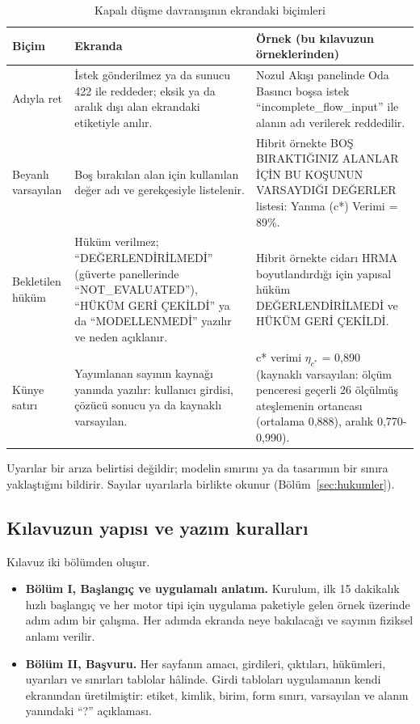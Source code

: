 \documentclass[11pt,a4paper]{article}
\newcommand{\ui}[1]{\textsf{#1}}
\begin{document}
\begin{table}[htbp]
\centering\small
\caption{Kapalı düşme davranışının ekrandaki biçimleri}\label{tab:kapali}
\begin{tabular}{@{}>{\raggedright\arraybackslash}p{3.6cm}>{\raggedright\arraybackslash}p{6.4cm}>{\raggedright\arraybackslash}p{5.6cm}@{}}
\toprule
\textbf{Biçim} & \textbf{Ekranda} & \textbf{Örnek (bu kılavuzun örneklerinden)} \\
\midrule
Adıyla ret & İstek gönderilmez ya da sunucu 422 ile reddeder; eksik ya da aralık dışı alan ekrandaki etiketiyle anılır. & Nozul Akışı panelinde \ui{Oda Basıncı} boşsa istek ``incomplete\_flow\_input'' ile alanın adı verilerek reddedilir. \\
Beyanlı varsayılan & Boş bırakılan alan için kullanılan değer adı ve gerekçesiyle listelenir. & Hibrit örnekte \ui{BOŞ BIRAKTIĞINIZ ALANLAR İÇİN BU KOŞUNUN VARSAYDIĞI DEĞERLER} listesi: \ui{Yanma (c*) Verimi = 89\%}. \\
Bekletilen hüküm & Hüküm verilmez; ``DEĞERLENDİRİLMEDİ'' (güverte panellerinde ``NOT\_EVALUATED''), ``HÜKÜM GERİ ÇEKİLDİ'' ya da ``MODELLENMEDİ'' yazılır ve neden açıklanır. & Hibrit örnekte cidarı HRMA boyutlandırdığı için yapısal hüküm \ui{DEĞERLENDİRİLMEDİ} ve \ui{HÜKÜM GERİ ÇEKİLDİ}. \\
Künye satırı & Yayımlanan sayının kaynağı yanında yazılır: kullanıcı girdisi, çözücü sonucu ya da kaynaklı varsayılan. & \ui{c* verimi $\eta_{c^*}$ = 0,890 (kaynaklı varsayılan: ölçüm penceresi geçerli 26 ölçülmüş ateşlemenin ortancası (ortalama 0,888), aralık 0,770-0,990)}. \\
\bottomrule
\end{tabular}
\end{table}

Uyarılar bir arıza belirtisi değildir; modelin sınırını ya da tasarımın bir
sınıra yaklaştığını bildirir. Sayılar uyarılarla birlikte okunur
(Bölüm~\ref{sec:hukumler}).

\subsection{Kılavuzun yapısı ve yazım kuralları}

Kılavuz iki bölümden oluşur.

\begin{itemize}[leftmargin=1.4em]
  \item \textbf{Bölüm I, Başlangıç ve uygulamalı anlatım.} Kurulum, ilk 15
  dakikalık hızlı başlangıç ve her motor tipi için uygulama paketiyle gelen
  örnek üzerinde adım adım bir çalışma. Her adımda ekranda neye bakılacağı ve
  sayının fiziksel anlamı verilir.
  \item \textbf{Bölüm II, Başvuru.} Her sayfanın amacı, girdileri, çıktıları,
  hükümleri, uyarıları ve sınırları tablolar hâlinde. Girdi tabloları
  uygulamanın kendi ekranından üretilmiştir: etiket, kimlik, birim, form
  sınırı, varsayılan ve alanın yanındaki ``?'' açıklaması.
\end{itemize}
\end{document}
